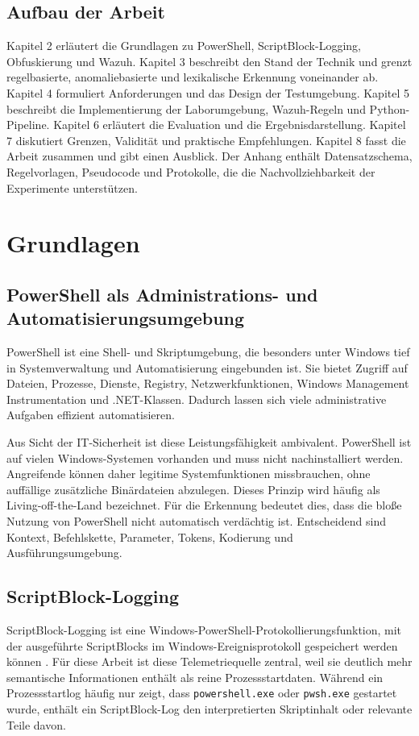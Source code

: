 \documentclass[12pt,a4paper,oneside,parskip=half]{scrreprt}
\begin{document}
\section{Aufbau der Arbeit}
Kapitel 2 erläutert die Grundlagen zu PowerShell, ScriptBlock-Logging, Obfuskierung und Wazuh. Kapitel 3 beschreibt den Stand der Technik und grenzt regelbasierte, anomaliebasierte und lexikalische Erkennung voneinander ab. Kapitel 4 formuliert Anforderungen und das Design der Testumgebung. Kapitel 5 beschreibt die Implementierung der Laborumgebung, Wazuh-Regeln und Python-Pipeline. Kapitel 6 erläutert die Evaluation und die Ergebnisdarstellung. Kapitel 7 diskutiert Grenzen, Validität und praktische Empfehlungen. Kapitel 8 fasst die Arbeit zusammen und gibt einen Ausblick. Der Anhang enthält Datensatzschema, Regelvorlagen, Pseudocode und Protokolle, die die Nachvollziehbarkeit der Experimente unterstützen.

\chapter{Grundlagen}

\section{PowerShell als Administrations- und Automatisierungsumgebung}
PowerShell ist eine Shell- und Skriptumgebung, die besonders unter Windows tief in Systemverwaltung und Automatisierung eingebunden ist. Sie bietet Zugriff auf Dateien, Prozesse, Dienste, Registry, Netzwerkfunktionen, Windows Management Instrumentation und .NET-Klassen. Dadurch lassen sich viele administrative Aufgaben effizient automatisieren.

Aus Sicht der IT-Sicherheit ist diese Leistungsfähigkeit ambivalent. PowerShell ist auf vielen Windows-Systemen vorhanden und muss nicht nachinstalliert werden. Angreifende können daher legitime Systemfunktionen missbrauchen, ohne auffällige zusätzliche Binärdateien abzulegen. Dieses Prinzip wird häufig als Living-off-the-Land bezeichnet. Für die Erkennung bedeutet dies, dass die bloße Nutzung von PowerShell nicht automatisch verdächtig ist. Entscheidend sind Kontext, Befehlskette, Parameter, Tokens, Kodierung und Ausführungsumgebung.

\section{ScriptBlock-Logging}
ScriptBlock-Logging ist eine Windows-PowerShell-Protokollierungsfunktion, mit der ausgeführte ScriptBlocks im Windows-Ereignisprotokoll gespeichert werden können \cite{microsoft-logging-windows,microsoft-logging}. Für diese Arbeit ist diese Telemetriequelle zentral, weil sie deutlich mehr semantische Informationen enthält als reine Prozessstartdaten. Während ein Prozessstartlog häufig nur zeigt, dass \texttt{powershell.exe} oder \texttt{pwsh.exe} gestartet wurde, enthält ein ScriptBlock-Log den interpretierten Skriptinhalt oder relevante Teile davon.
\end{document}
